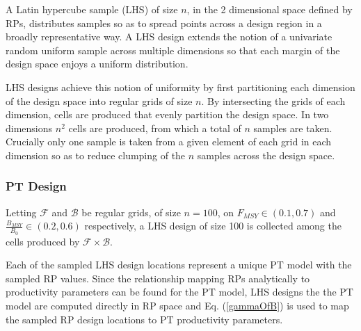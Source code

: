 \documentclass[12pt]{article}
\begin{document}

%
A Latin hypercube sample (LHS) of size $n$, in the 2 dimensional space defined 
by RPs, distributes samples so as to spread points across a design region in a 
broadly representative way. A LHS design extends the notion of a univariate 
random uniform sample across multiple dimensions so that each margin of the design 
space enjoys a uniform distribution. 

%
LHS designs achieve this notion of uniformity by first partitioning each dimension 
of the design space into regular grids of size $n$. By intersecting the grids 
of each dimension, cells are produced that evenly partition the design space. 
In two dimensions $n^2$ cells are produced, from which a total of $n$ samples 
are taken. Crucially only one sample is taken from a given element of each grid 
in each dimension so as to reduce clumping of the $n$ samples across the design space.



%
 

%
\subsubsection{PT Design}

%
Letting $\mathcal{F}$ and $\mathcal{B}$ be regular grids, of size $n=100$, on
\mbox{$F_{MSY}\in(0.1, 0.7)$} and \mbox{$\frac{B_{MSY}}{B_0}\in(0.2, 0.6)$}
respectively, a LHS design of size 100 is collected among the cells produced by
$\mathcal{F}\times\mathcal{B}$. 

%
Each of the sampled LHS design locations represent a unique PT model with the 
sampled RP values. Since the relationship mapping RPs analytically to productivity 
parameters can be found for the PT model, LHS designs the the PT model are 
computed directly in RP space and Eq. (\ref{gammaOfB}) is used to map the 
sampled RP design locations to PT productivity parameters. 
%
%
\end{document}
